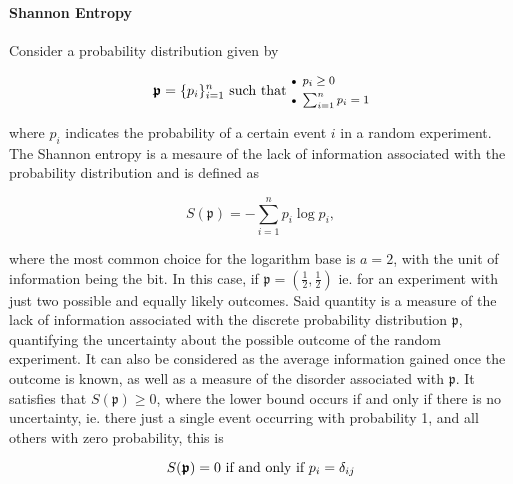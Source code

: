 \documentclass{homework}
\begin{document}
\paragraph{\textbf{Shannon Entropy}}

Consider a probability distribution given by 

\begin{equation}
    \bm{\mathfrak{p}} = \{p_i\}_{i=1}^{n} \textnormal{ such that }  \begin{medsize}\begin{array}{@{\mathsmaller{\bullet}\enspace}l@{}}
    p_i \geq 0 \\[1ex]
    \sum_{i=1}^{n} p_i = 1 
    \end{array}\end{medsize}
\end{equation}

where $p_i$ indicates the probability of a certain event $i$ in a random experiment. The Shannon entropy is a mesaure of the lack of information associated with the probability distribution and is defined as 

\begin{equation}
    S(\bm{\mathfrak{p}}) = - \sum_{i=1}^{n} p_i \log p_i,
\end{equation}

where the most common choice for the logarithm base is $a=2$, with the unit of information being the bit. In this case, if $\bm{\mathfrak{p}} = \left(\frac{1}{2},\frac{1}{2}\right)$ ie. for an experiment with just two possible and equally likely outcomes. Said quantity is a measure of the lack of information associated with the discrete probability distribution $\bm{\mathfrak{p}}$, quantifying the uncertainty about the possible outcome of the random experiment. It can also be considered as the average information gained once the outcome is known, as well as a measure of the disorder associated with $\bm{\mathfrak{p}}$. It satisfies that $S(\bm{\mathfrak{p}}) \geq 0$, where the lower bound occurs if and only if there is no uncertainty, ie. there just a single event occurring with probability 1, and all others with zero probability, this is 

\begin{equation}
    S(\bm{\mathfrak{p}}) = 0 \textnormal{ if and only if } p_i = \delta_{ij}
\end{equation}
\end{document}
